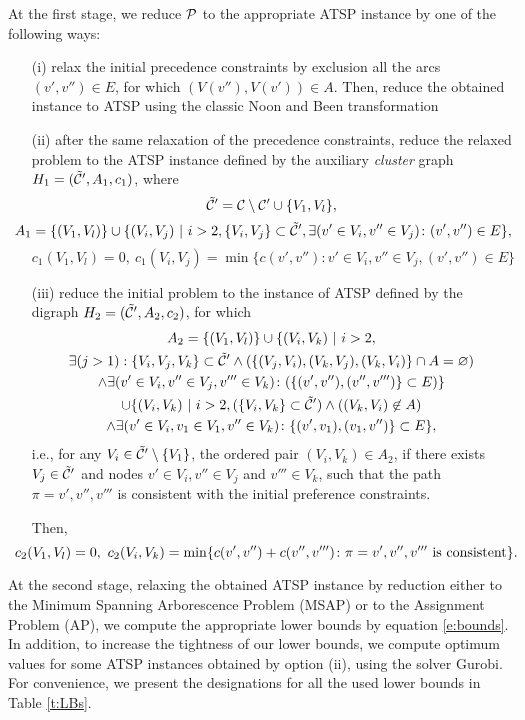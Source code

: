 At the first stage, we reduce $\P$ to the appropriate ATSP instance by one of the following ways:
\begin{itemize}
	\item[(i)] relax the initial precedence constraints by exclusion all the arcs $(v',v'')\in E$, for which $(V(v''),V(v'))\in A$. Then, reduce the obtained instance to ATSP using the classic Noon and Been transformation \cite{NoonBean1993}
	\item[(ii)] after the same relaxation of the precedence constraints, reduce the relaxed problem to the ATSP instance defined by the auxiliary \textit{cluster} graph $H_1=(\tilde\C',A_1, c_1)$, where
	\[
		\tilde\C'=\C\setminus\C'\cup\{V_1,V_l\},
	\]
	\[\hspace*{-3ex}
	A_1=\{(V_1,V_l)\}\cup\{(V_i,V_j)\ |\  i>2, \{V_i,V_j\}\subset\tilde\C', \exists (v'\in V_i, v''\in V_j)\colon (v',v'')\in E\},
	\]
	\[
	c_1(V_1,V_l) = 0,\ c_1(V_i,V_j) = \min\{c(v',v'')\colon v'\in V_i, v''\in V_j, (v',v'')\in E\}
	\]
	\item[(iii)] reduce the initial problem to the instance of ATSP defined by the digraph $H_2=(\tilde\C',A_2, c_2)$, for which
	\begin{multline*}
	A_2=\{(V_1,V_l)\}\cup\{(V_i, V_k)\ |\ i>2,\\ \exists (j>1): \{V_i,V_j,V_k\}\subset\tilde\C' \wedge (\{(V_j,V_i), (V_k,V_j), (V_k, V_i)\}\cap A=\varnothing)\\
	 \wedge \exists (v'\in V_i, v''\in V_j, v'''\in V_k)\colon (\{(v',v''),(v'',v''')\}\subset E)\}\\
	\cup \{(V_i, V_k)\ |\ i>2, (\{V_i,V_k\}\subset\tilde\C')\wedge ((V_k,V_i)\not\in A)\\
	\wedge \exists (v'\in V_i, v_1\in V_1, v''\in V_k)\colon \{(v',v_1), (v_1,v'')\}\subset E\},	
	\end{multline*}
	i.e., for any $V_i\in \tilde\C'\setminus\{V_1\}$, the ordered pair $(V_i,V_k)\in A_2$, if there exists $V_j\in\tilde\C'$ and nodes $v'\in V_i, v''\in V_j$ and $v'''\in V_k$, such that the path $\pi = v',v'', v'''$ is consistent with the initial preference constraints. 

	Then,  
	\[
	\hspace*{-3ex} c_2(V_1,V_l) = 0,\ c_2(V_i,V_k) = \min\{c(v',v'')+c(v'',v''')\colon \pi=v',v'', v''' \text{ is consistent}\}.
	\]
\end{itemize}

At the second stage, relaxing the obtained ATSP instance by reduction either to the Minimum Spanning Arborescence Problem (MSAP) or to the Assignment Problem (AP), we compute the appropriate lower bounds by equation \eqref{e:bounds}. In addition,  to increase the tightness of our lower bounds, we compute optimum values for some ATSP instances obtained by option (ii), using the solver Gurobi. For convenience, we present the designations for all the used lower bounds in Table \ref{t:LBs}. 

